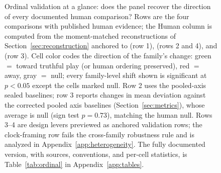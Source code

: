 \begin{figure}[t]
\caption{Ordinal validation at a glance: does the panel recover the direction of every documented human comparison? Rows are the four comparisons with published human evidence; the Human column is computed from the moment-matched reconstructions of Section~\ref{sec:reconstruction} anchored to \citet{kagel1993independent} (row 1), \citet{li2017obviously, breitmoser2022obviousness} (rows 2 and 4), and \citet{gonczarowski2023strategyproofness} (row 3). Cell color codes the direction of the family's change: green $=$ toward truthful play (or human ordering preserved), red $=$ away, gray $=$ null; every family-level shift shown is significant at $p<0.05$ except the cells marked null. Row 2 uses the pooled-axis sealed baselines; row 3 reports changes in mean deviation against the corrected pooled axis baselines (Section~\ref{sec:metrics}), whose average is null (sign test $p=0.73$), matching the human null. Rows 3--4 are design levers previewed as anchored validation rows; the clock-framing row fails the cross-family robustness rule and is analyzed in Appendix~\ref{app:heterogeneity}. The fully documented version, with sources, conventions, and per-cell statistics, is Table~\ref{tab:ordinal} in Appendix~\ref{app:tables}.}
\label{fig:ordinal}
\end{figure}

